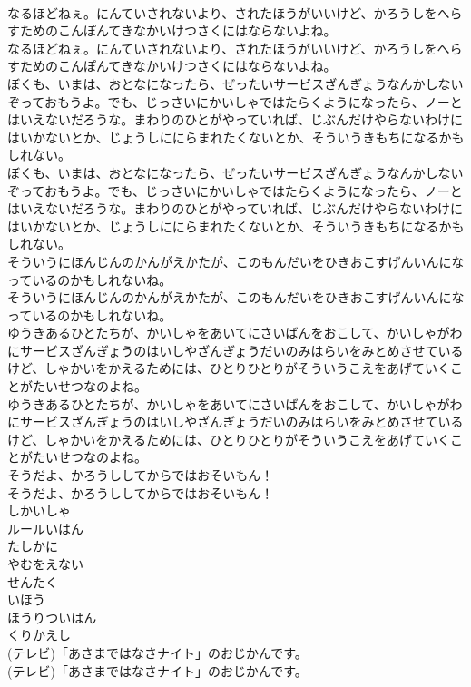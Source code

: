 \documentclass[8pt]{extreport}
\begin{document}
\begin{CJK}{UTF8}{min}
\\	なるほどねぇ。にんていされないより、されたほうがいいけど、かろうしをへらすためのこんぽんてきなかいけつさくにはならないよね。
\\	なるほどねぇ。にんていされないより、されたほうがいいけど、かろうしをへらすためのこんぽんてきなかいけつさくにはならないよね。
\\	ぼくも、いまは、おとなになったら、ぜったいサービスざんぎょうなんかしないぞっておもうよ。でも、じっさいにかいしゃではたらくようになったら、ノーとはいえないだろうな。まわりのひとがやっていれば、じぶんだけやらないわけにはいかないとか、じょうしににらまれたくないとか、そういうきもちになるかもしれない。
\\	ぼくも、いまは、おとなになったら、ぜったいサービスざんぎょうなんかしないぞっておもうよ。でも、じっさいにかいしゃではたらくようになったら、ノーとはいえないだろうな。まわりのひとがやっていれば、じぶんだけやらないわけにはいかないとか、じょうしににらまれたくないとか、そういうきもちになるかもしれない。
\\	そういうにほんじんのかんがえかたが、このもんだいをひきおこすげんいんになっているのかもしれないね。
\\	そういうにほんじんのかんがえかたが、このもんだいをひきおこすげんいんになっているのかもしれないね。
\\	ゆうきあるひとたちが、かいしゃをあいてにさいばんをおこして、かいしゃがわにサービスざんぎょうのはいしやざんぎょうだいのみはらいをみとめさせているけど、しゃかいをかえるためには、ひとりひとりがそういうこえをあげていくことがたいせつなのよね。
\\	ゆうきあるひとたちが、かいしゃをあいてにさいばんをおこして、かいしゃがわにサービスざんぎょうのはいしやざんぎょうだいのみはらいをみとめさせているけど、しゃかいをかえるためには、ひとりひとりがそういうこえをあげていくことがたいせつなのよね。
\\	そうだよ、かろうししてからではおそいもん！
\\	そうだよ、かろうししてからではおそいもん！
\\	しかいしゃ
\\	ルールいはん
\\	たしかに
\\	やむをえない
\\	せんたく
\\	いほう
\\	ほうりついはん
\\	くりかえし
\\	(テレビ)「あさまではなさナイト」のおじかんです。
\\	(テレビ)「あさまではなさナイト」のおじかんです。

\end{CJK}
\end{document}
